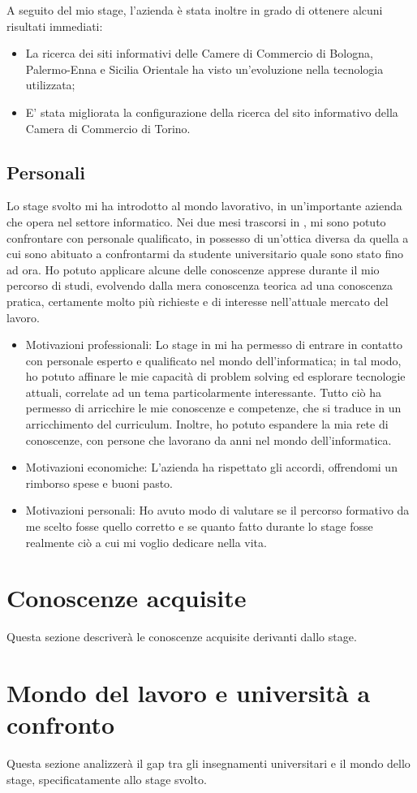 	A seguito del mio stage, l'azienda è stata inoltre in grado di ottenere alcuni risultati immediati:
	\begin{itemize}
		\item {La ricerca dei siti informativi delle Camere di Commercio di Bologna, Palermo-Enna e Sicilia Orientale ha visto un'evoluzione nella tecnologia utilizzata;}
		\item {E' stata migliorata la configurazione della ricerca del sito informativo della Camera di Commercio di Torino.}
	\end{itemize}

	\subsection{Personali}
	Lo stage svolto mi ha introdotto al mondo lavorativo, in un'importante azienda che opera nel settore informatico. Nei due mesi trascorsi in \nomeAzienda, mi sono potuto confrontare con personale qualificato, in possesso di un'ottica diversa da quella a cui sono abituato a confrontarmi da studente universitario quale sono stato fino ad ora. Ho potuto applicare alcune delle conoscenze apprese durante il mio percorso di studi, evolvendo dalla mera conoscenza teorica ad una conoscenza pratica, certamente molto più richieste e di interesse nell'attuale mercato del lavoro.	
	
	\begin{itemize}
		
		\item {Motivazioni professionali: Lo stage in \nomeAzienda mi ha permesso di entrare in contatto con personale esperto e qualificato nel mondo dell'informatica; in tal modo, ho potuto affinare le mie capacità di problem solving ed esplorare tecnologie attuali, correlate ad un tema particolarmente interessante. Tutto ciò ha permesso di arricchire le mie conoscenze e competenze, che si traduce in un arricchimento del curriculum. Inoltre, ho potuto espandere la mia rete di conoscenze, con persone che lavorano da anni nel mondo dell'informatica.}
		
		\item {Motivazioni economiche: L'azienda ha rispettato gli accordi, offrendomi un rimborso spese e buoni pasto.}
		
		\item {Motivazioni personali: Ho avuto modo di valutare se il percorso formativo da me scelto fosse quello corretto e se quanto fatto durante lo stage fosse realmente ciò a cui mi voglio dedicare nella vita.}
		
	\end{itemize}

\section{Conoscenze acquisite}
Questa sezione descriverà le conoscenze acquisite derivanti dallo stage.

\section{Mondo del lavoro e università a confronto}
Questa sezione analizzerà il gap tra gli insegnamenti universitari e il mondo dello stage, specificatamente allo stage svolto.